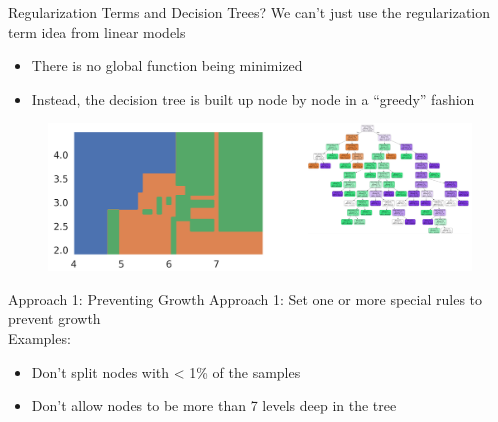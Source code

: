 \documentclass[aspectratio=169]{../latex_main/tntbeamer}  %
\begin{document}
	\begin{frame}{Regularization Terms and Decision Trees?}
	    We can’t just use the regularization term idea from linear models
	    \begin{itemize}
	        \item There is no global function being minimized
	        \item Instead, the decision tree is built up node by node in a “greedy” fashion
	    \end{itemize}
	    \begin{figure}
	        \centering
	        \includegraphics[scale=.45]{Bild52}
	    \end{figure}
	\end{frame}
	
	
	\begin{frame}{Approach 1: Preventing Growth}
	    Approach 1: Set one or more special rules to prevent growth\\
	    \bigskip
	    Examples:
	    \begin{itemize}
	        \item Don’t split nodes with < 1\% of the samples  
	        \item Don’t allow nodes to be more than 7 levels deep in the tree
	    \end{itemize}
	\end{frame}
	
\end{document}
